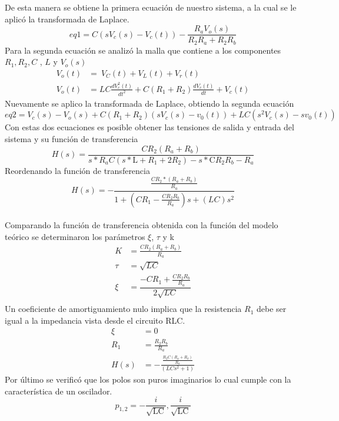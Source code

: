 \documentclass[10pt,a4paper]{article} %
\begin{document}
De esta manera se obtiene la primera ecuación de nuestro sistema, a la cual se le aplicó la transformada de Laplace. 
\begin{equation}
eq1=C(s V_{c}(s)-V_{c}(t))-\frac{R_{a} V_{o}(s)}{R_{2} R_{a} +R_{2} R_{b}}
\end{equation}
Para la segunda ecuación se analizó la malla que contiene a los componentes $R_{1},R_{2}, C$ , $L$ y $V_{o}(s)$ 
\begin{align*}
 V_{o}(t)&=\ V_{C}(t)+ V_{L}(t)+ V_{r}(t)\\
V_{o}(t)&=LC\frac{d V_{c}^{2}(t)}{dt^{2}}+ C(R_{1}+R_{2})\frac{d V_{c}(t)}{dt}+V_{c}(t)
\end{align*}
Nuevamente se aplico la transformada de Laplace, obtiendo la segunda ecuación
\begin{equation}
eq2 = V_{c}(s) - V_{o}(s) + C(R_{1} + R_{2})(sV_{c}(s) - v_{0}(t)) + 
LC(s^{2}V_{c}(s) - sv_{0}(t))
\end{equation}
Con estas dos ecuaciones es posible obtener las tensiones de salida y entrada del sistema y su función de transferencia 
\begin{equation*}
H(s)=\frac{C R_{2} (R_{a}+R_{b})}{s*R_{a}C (s*\text{L} +R_{1}+2 R_{2})-s*\text{C}R_{2} R_{b} -R_{a}}
\end{equation*}
Reordenando la función de transferencia
\begin{equation*}
H(s)=-\frac{\frac{CR_{2}*(R_{a}+R_{b})}{R_{a}}}{1+(CR_{1}-\frac{CR_{2}R_{b}}{R_{a}})s+(LC)s^{2}}
\end{equation*}
\\
Comparando la función de transferencia obtenida con la función del modelo teórico se determinaron los parámetros $\xi$, $\tau$ y k 
\begin{align*}
K&=\frac{CR_{2}(R_{a}+R_{b})}{R_{a}}\\
\tau&=\sqrt{LC}\\
\xi&=\dfrac{-CR_{1}+\frac{CR_{2}R_{b}}{R_{a}}}{2\sqrt{LC}}\\
\end{align*}
Un coeficiente de amortiguamiento nulo implica que la resistencia $R_{1}$ debe ser igual a la impedancia vista desde el circuito RLC.
\begin{align*}
\xi&=0\\
R_{1}&=\frac{R_{2}R_{b}}{R_{a}}\\
H(s)&=-\frac{\frac{R_{2}C (R_{a}+R_{b})}{R_{a}}}{\left(LCs^2+1\right)}
\end{align*}
Por último se verificó que los polos son puros imaginarios lo cual cumple con la característica de un oscilador.
 \begin{equation*}
p_{1,2}=-\frac{i}{\sqrt{\text{L}\text{C}}},\frac{i}{\sqrt{\text{L}\text{C}}}
\end{equation*}
\end{document}
